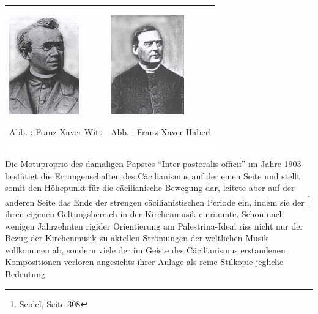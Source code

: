 \begin{center}
\begin{minipage}{6.943cm}
\begin{flushleft}
\tablefirsthead{}
\tablehead{}
\tabletail{}
\tablelasttail{}
\begin{supertabular}{m{3.197cm}m{3.345cm}}

\includegraphics[width=3.016cm,height=4.284cm]{pictures/zulassungsarbeit-img078.jpg}

Abb. : Franz Xaver Witt &

\includegraphics[width=3.163cm,height=4.3cm]{pictures/zulassungsarbeit-img079.jpg}

Abb. : Franz Xaver Haberl\\
\end{supertabular}
\end{flushleft}
\end{minipage}
\end{center}
Die Motuproprio des damaligen Papstes “Inter pastoralis officii” im
Jahre 1903 bestätigt die Errungenschaften des Cäcilianismus auf der
einen Seite und stellt somit den Höhepunkt für die cäcilianische
Bewegung dar, leitete aber auf der anderen Seite das Ende der strengen
cäcilianistischen Periode ein, indem sie der  \footnote{Seidel, Seite 308} ihren eigenen Geltungsbereich in
der Kirchenmusik einräumte. Schon nach wenigen Jahrzehnten rigider
Orientierung am Palestrina-Ideal riss nicht nur der Bezug der
Kirchenmusik zu aktellen Strömungen der weltlichen Musik vollkommen ab,
sondern viele der im Geiste des Cäcilianismus erstandenen Kompositionen
verloren angesichts ihrer Anlage als reine Stilkopie jegliche Bedeutung
